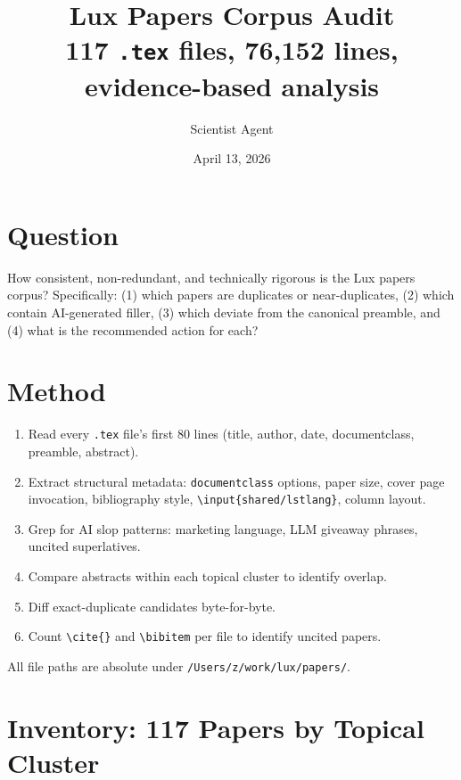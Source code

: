 \documentclass[11pt,a4paper]{article}
\title{Lux Papers Corpus Audit\\[4pt]
\large 117 \texttt{.tex} files, 76{,}152 lines, evidence-based analysis}
\author{Scientist Agent}
\date{April 13, 2026}
\begin{document}
\maketitle
\tableofcontents
\newpage

\section{Question}

How consistent, non-redundant, and technically rigorous is the Lux papers
corpus? Specifically: (1) which papers are duplicates or near-duplicates,
(2) which contain AI-generated filler, (3) which deviate from the canonical
preamble, and (4) what is the recommended action for each?

\section{Method}

\begin{enumerate}
\item Read every \texttt{.tex} file's first 80 lines (title, author, date,
      documentclass, preamble, abstract).
\item Extract structural metadata: \texttt{documentclass} options, paper size,
      cover page invocation, bibliography style, \texttt{\textbackslash input\{shared/lstlang\}},
      column layout.
\item Grep for AI slop patterns: marketing language, LLM giveaway phrases,
      uncited superlatives.
\item Compare abstracts within each topical cluster to identify overlap.
\item Diff exact-duplicate candidates byte-for-byte.
\item Count \texttt{\textbackslash cite\{\}} and \texttt{\textbackslash bibitem}
      per file to identify uncited papers.
\end{enumerate}

All file paths are absolute under \texttt{/Users/z/work/lux/papers/}.

\section{Inventory: 117 Papers by Topical Cluster}
\end{document}

